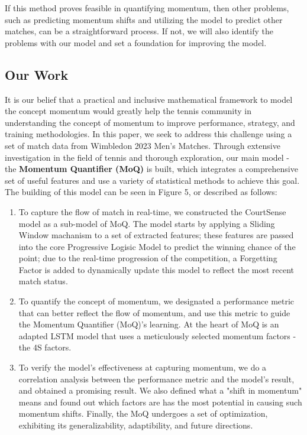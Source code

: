 \documentclass[12pt]{article}  %
\begin{document}
If this method proves feasible in quantifying momentum, then other problems, such as predicting momentum shifts and utilizing the model to predict other matches, can be a straightforward process. If not, we will also identify the problems with our model and set a foundation for improving the model.

\subsection{Our Work}
It is our belief that a practical and inclusive mathematical framework to model the concept momentum would greatly help the tennis community in understanding the concept of momentum to improve performance, strategy, and training methodologies. In this paper, we seek to address this challenge using a set of match data from Wimbledon 2023 Men's Matches. Through extensive investigation in the field of tennis and thorough exploration, our main model - the \textbf{Momentum Quantifier (MoQ)} is built, which integrates a comprehensive set of useful features and use a variety of statistical methods to achieve this goal. The building of this model can be seen in Figure 5, or described as follows:
\begin{enumerate}[\bfseries (1)]
	\setlength{\parsep}{0ex} %
	\setlength{\topsep}{0ex} %
	\setlength{\itemsep}{0ex} %
	\item To capture the flow of match in real-time, we constructed the CourtSense model as a sub-model of MoQ. The model starts by applying a Sliding Window machanism to a set of extracted features; these features are passed into the core Progressive Logisic Model to predict the winning chance of the point; due to the real-time progression of the competition, a Forgetting Factor is added to dynamically update this model to reflect the most recent match status. 
	\item To quantify the concept of momentum, we designated a performance metric that can better reflect the flow of momentum, and use this metric to guide the Momentum Quantifier (MoQ)'s learning. At the heart of MoQ is an adapted LSTM model that uses a meticulously selected momentum factors - the 4S factors.
	\item To verify the model's effectiveness at capturing momentum, we do a correlation analysis between the performance metric and the model's result, and obtained a promising result. We also defined what a "shift in momentum" means and found out which factors are has the most potential in causing such momentum shifts. Finally, the MoQ undergoes a set of optimization, exhibiting its generalizability, adaptibility, and future directions.
\end{enumerate}
\end{document}
